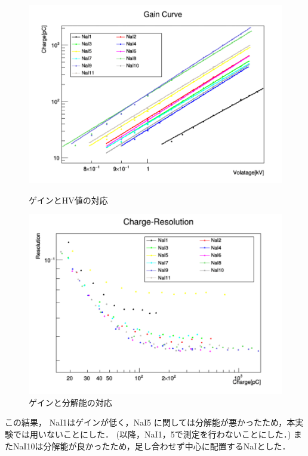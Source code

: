 \begin{figure}[H]
  \begin{minipage}{0.45\hsize}
    \begin{center}\hspace*{-1em}
      \includegraphics[width=1.1\textwidth]{figure/tajima/gain_curve.png}
    \end{center}
    \caption{ゲインとHV値の対応}
    \label{GainHV}
  \end{minipage}
  \hfill
  \begin{minipage}{0.45\hsize}
    \begin{center}
      \includegraphics[width=1.1\textwidth]{figure/tajima/charge_resolution.png}
    \end{center}
    \caption{ゲインと分解能の対応}
    \label{resoHV}
  \end{minipage}
\end{figure}
この結果， NaI1はゲインが低く，NaI5 に関しては分解能が悪かったため，本実験では用いないことにした．
(以降，NaI1，5で測定を行わないことにした．)
またNaI10は分解能が良かったため，足し合わせず中心に配置するNaIとした．


